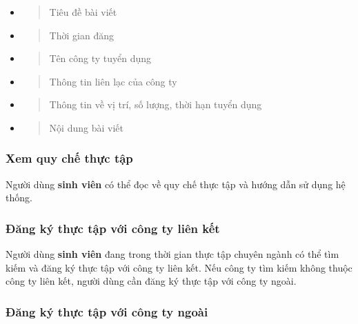 \documentclass[./../main.tex]{subfiles}
\begin{document}
  \begin{itemize}
  \item
    \begin{quote}
    Tiêu đề bài viết
    \end{quote}
  \item
    \begin{quote}
    Thời gian đăng
    \end{quote}
  \item
    \begin{quote}
    Tên công ty tuyển dụng
    \end{quote}
  \item
    \begin{quote}
    Thông tin liên lạc của công ty
    \end{quote}
  \item
    \begin{quote}
    Thông tin về vị trí, số lượng, thời hạn tuyển dụng
    \end{quote}
  \item 
    \begin{quote}
    Nội dung bài viết
    \end{quote}
  \end{itemize}
  
  \hypertarget{xem-quy-chux1ebf-thux1ef1c-tux1eadp}{%
  \subsubsection{Xem quy chế thực
  tập}\label{xem-quy-chux1ebf-thux1ef1c-tux1eadp}}
  
  Người dùng \textbf{sinh viên} có thể đọc về quy chế thực tập và hướng
  dẫn sử dụng hệ thống.
  
  \hypertarget{ux111ux103ng-kuxfd-thux1ef1c-tux1eadp-vux1edbi-cuxf4ng-ty-liuxean-kux1ebft}{%
  \subsubsection{Đăng ký thực tập với công ty liên
  kết}\label{ux111ux103ng-kuxfd-thux1ef1c-tux1eadp-vux1edbi-cuxf4ng-ty-liuxean-kux1ebft}}
  
  Người dùng \textbf{sinh viên} đang trong thời gian thực tập chuyên ngành
  có thể tìm kiếm và đăng ký thực tập với công ty liên kết. Nếu công ty
  tìm kiếm không thuộc công ty liên kết, người dùng cần đăng ký thực tập
  với công ty ngoài.
  
  \hypertarget{ux111ux103ng-kuxfd-thux1ef1c-tux1eadp-vux1edbi-cuxf4ng-ty-ngouxe0i}{%
  \subsubsection{Đăng ký thực tập với công ty
  ngoài}\label{ux111ux103ng-kuxfd-thux1ef1c-tux1eadp-vux1edbi-cuxf4ng-ty-ngouxe0i}}
  
\end{document}
